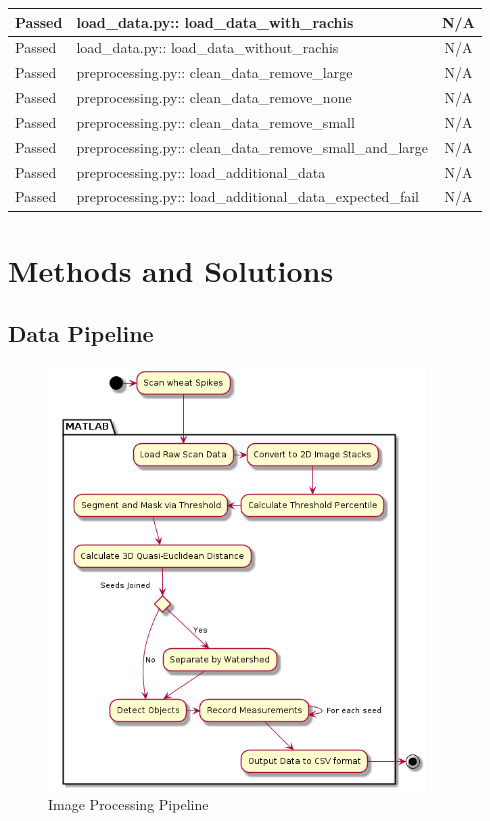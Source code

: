 \documentclass[11pt]{report}
\begin{document}
\begin{longtable}{|l|p{6.5cm}|C|}
\hline
\color{ForestGreen}Passed & load\_data.py:: load\_data\_with\_rachis & N/A\\
\hline
\color{ForestGreen}Passed & load\_data.py:: load\_data\_without\_rachis & N/A\\
\hline
\color{ForestGreen}Passed & preprocessing.py:: clean\_data\_remove\_large & N/A\\
\hline
\color{ForestGreen}Passed & preprocessing.py:: clean\_data\_remove\_none & N/A\\
\hline
\color{ForestGreen}Passed & preprocessing.py:: clean\_data\_remove\_small & N/A\\
\hline
\color{ForestGreen}Passed & preprocessing.py:: clean\_data\_remove\_small\_and\_large & N/A\\
\hline
\color{ForestGreen}Passed & preprocessing.py:: load\_additional\_data & N/A\\
\hline
\color{ForestGreen}Passed & preprocessing.py:: load\_additional\_data\_expected\_fail & N/A\\
\hline
\end{longtable}



\chapter{Methods and Solutions}
\label{sec-3}
\section{Data Pipeline}
\label{sec-3-1}

\begin{center}
\begin{figure}[htb]
\centering
\includegraphics[width=10cm]{./images/matlab.png}
\caption{\label{fig:matlab}Image Processing Pipeline}
\end{figure}
\end{center}
\end{document}
